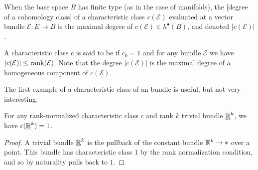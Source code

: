 \begin{remark}
	When the base space $B$ has finite type (as in the case of manifolds), the [degree of a cohomology class] of a characteristic class $c(\mathcal{E})$ evaluated at a vector bundle $\mathcal{E} : E \to B$ is the maximal degree of $c(\mathcal{E})\in h^\bullet(B)$, and denoted $|c(\mathcal{E})|$.
\end{remark}

\begin{definition}
	A characteristic class $c$ is said to be  if $c_0=1$ and for any bundle $\mathcal{E}$ we have $|c(\mathcal{E})|\leq \operatorname{rank}(\mathcal{E})$. Note that the degree $|c(\mathcal{E})|$ is the maximal degree of a homogeneous component of $c(\mathcal{E})$.
\end{definition}

The first example of a characteristic class of an bundle is useful, but not very interesting.

\begin{corollary}
	For any rank-normalized characteristic class $c$ and rank $k$ trivial bundle $\underline{\mathbb{R}}^k$, we have $c(\underline{\mathbb{R}}^k)=1$.
\end{corollary}
\begin{proof}
	A trivial bundle $\underline{\mathbb{R}}^k$ is the pullback of the constant bundle $\mathbb{R}^k\to *$ over a point. This bundle has characteristic class $1$ by the rank normalization condition, and so by naturality pulls back to $1$.
\end{proof}
%
%

